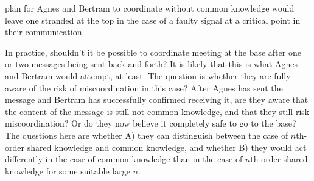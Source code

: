 \documentclass[twocolumn,a4paper,superscriptaddress,nofootinbib]{revtex4}
\newcommand{\add}[1]{{\color{green2} Add: #1}}
\begin{document}
plan for Agnes and Bertram to coordinate without common knowledge would leave one stranded at the top in the case of a faulty signal at a critical point in their communication.

In practice, shouldn't it be possible to coordinate meeting at the base after one or two messages being sent back and forth? It is likely that this is what Agnes and Bertram would attempt, at least. The question is whether they are fully aware of the risk of miscoordination in this case? After Agnes has sent the message and Bertram has successfully confirmed receiving it, are they aware that the content of the message is still not common knowledge, and that they still risk miscoordination? Or do they now believe it completely safe to go to the base? The questions here are whether A) they can distinguish between the case of $n$th-order shared knowledge and common knowledge, and whether B) they would act differently in the case of common knowledge than in the case of $n$th-order shared knowledge for some suitable large $n$. 
\end{document}
